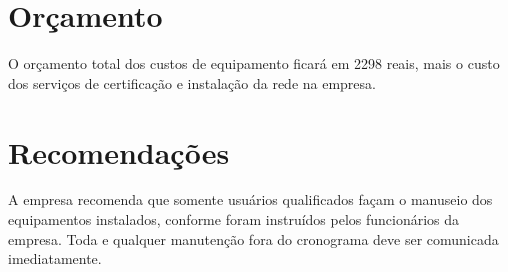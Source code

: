 \documentclass[	DIV=calc,%
							paper=a4,%
							fontsize=12pt,%
							onecolumn]{scrartcl}	 					%
\begin{document}
\section{Orçamento}
O orçamento total dos custos de equipamento ficará em 2298 reais, mais o custo dos serviços de certificação e instalação da rede na empresa.

\section{Recomendações}
A empresa recomenda que somente usuários qualificados façam o manuseio dos equipamentos instalados, conforme foram instruídos pelos funcionários da empresa. Toda e qualquer manutenção fora do cronograma deve ser comunicada imediatamente.
\end{document}
